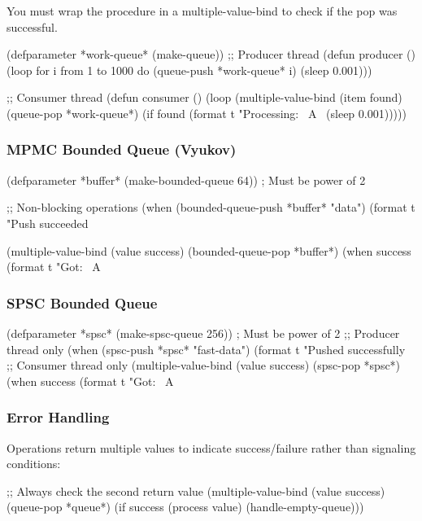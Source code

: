 \documentclass[12pt, letterpaper]{article}
\DeclareRobustCommand{\code}[1]{%
	\begingroup
	\setlength{\fboxsep}{2pt}%
	\colorbox{gray!15}{\ttfamily\small #1}%
	\endgroup
}
\begin{document}
	You must wrap the procedure in a \code{multiple-value-bind} to check if the pop was successful.
	
\begin{lispcode}
(defparameter *work-queue* (make-queue))
;; Producer thread
(defun producer ()
(loop for i from 1 to 1000 do
(queue-push *work-queue* i)
(sleep 0.001)))

;; Consumer thread
(defun consumer ()
(loop
(multiple-value-bind (item found)
(queue-pop *work-queue*)
(if found
(format t "Processing: ~A~%
(sleep 0.001)))))
\end{lispcode}
	
	\subsubsection{MPMC Bounded Queue (Vyukov)}
\begin{lispcode}
(defparameter *buffer* (make-bounded-queue 64))  ; Must be power of 2

;; Non-blocking operations
(when (bounded-queue-push *buffer* "data")
(format t "Push succeeded~%

(multiple-value-bind (value success)
(bounded-queue-pop *buffer*)
(when success
(format t "Got: ~A~%
\end{lispcode}
	
	\subsubsection{SPSC Bounded Queue}
\begin{lispcode}
(defparameter *spsc* (make-spsc-queue 256))  ; Must be power of 2
;; Producer thread only
(when (spsc-push *spsc* "fast-data")
(format t "Pushed successfully~%
;; Consumer thread only  
(multiple-value-bind (value success)
(spsc-pop *spsc*)
(when success
(format t "Got: ~A~%
\end{lispcode}
	
	\subsubsection{Error Handling}
	Operations return multiple values to indicate success/failure rather than signaling conditions:
\begin{lispcode}
;; Always check the second return value
(multiple-value-bind (value success)
(queue-pop *queue*)
(if success
(process value)
(handle-empty-queue)))
\end{lispcode}
	
\end{document}
